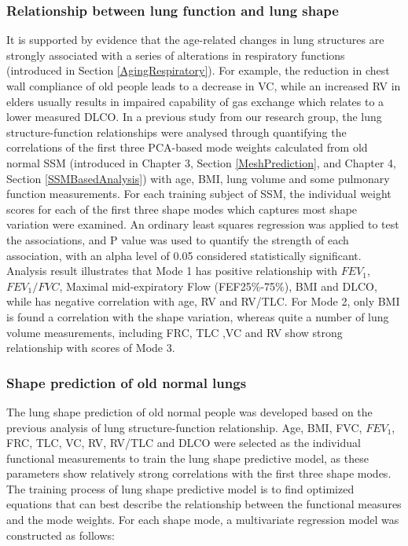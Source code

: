\subsubsection{Relationship between lung function and lung shape}
It is supported by evidence that the age-related changes in lung structures are strongly associated with a series of alterations in respiratory functions (introduced in Section \ref{AgingRespiratory}). For example, the reduction in chest wall compliance of old people leads to a decrease in VC, while an increased RV in elders usually results in impaired capability of gas exchange which relates to a lower measured DLCO. In a previous study from our research group, the lung structure-function relationships were analysed through quantifying the correlations of the first three PCA-based mode weights calculated from old normal SSM (introduced in Chapter 3, Section \ref{MeshPrediction}, and Chapter 4, Section \ref{SSMBasedAnalysis}) with age, BMI, lung volume and some pulmonary function measurements. For each training subject of SSM, the individual weight scores for each of the first three shape modes which captures most shape variation were examined. An ordinary least squares regression was applied to test the associations, and P value was used to quantify the strength of each association, with an alpha level of 0.05 considered statistically significant. Analysis result illustrates that Mode 1 has positive relationship with $FEV_1$, $FEV_1/FVC$, Maximal mid-expiratory Flow (FEF25\%-75\%), BMI and DLCO, while has negative correlation with age, RV and RV/TLC. For Mode 2, only BMI is found a correlation with the shape variation, whereas quite a number of lung volume measurements, including FRC, TLC ,VC and RV show strong relationship with scores of Mode 3.

\subsubsection{Shape prediction of old normal lungs}
The lung shape prediction of old normal people was developed based on the previous analysis of lung structure-function relationship. Age, BMI, FVC, $FEV_1$, FRC, TLC, VC, RV, RV/TLC and DLCO were selected as the individual functional measurements to train the lung shape predictive model, as these parameters show relatively strong correlations with the first three shape modes. The training process of lung shape predictive model is to find optimized equations that can best describe the relationship between the functional measures and the mode weights. For each shape mode, a multivariate regression model was constructed as follows:

